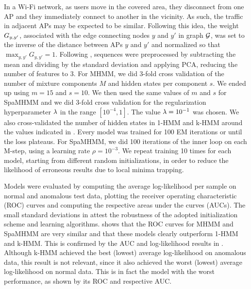 In a Wi-Fi network, as users move in the covered area, they disconnect from one AP and they immediately connect to another in the vicinity. As such, the traffic in adjacent APs may be expected to be similar. Following this idea, the weight ${G}_{y,y'}$, associated with the edge connecting nodes $y$ and $y'$ in graph ${\mathcal{G}}$, was set to the inverse of the distance between APs $y$ and $y'$ and normalized so that $\max_{y,y'} G_{y,y'}=1$. Following \citet{Anisa2017}, sequences were preprocessed by subtracting the mean and dividing by the standard deviation and applying PCA, reducing the number of features to 3. For MHMM, we did 3-fold cross validation of the number of mixture components $M$ and hidden states per component $s$. We ended up using $m=15$ and $s=10$. We then used the same values of $m$ and $s$ for SpaMHMM and we did 3-fold cross validation for the regularization hyperparameter $\lambda$ in the range $[10^{-4}, 1]$. The value $\lambda=10^{-1}$ was chosen. We also cross-validated the number of hidden states in 1-HMM and k-HMM around the values indicated in . Every model was trained for 100 EM iterations or until the loss plateaus. For SpaMHMM, we did 100 iterations of the inner loop on each M-step, using a learning rate $\rho=10^{-3}$. We repeat training 10 times for each model, starting from different random initializations, in order to reduce the likelihood of erroneous results due to local minima trapping.

Models were evaluated by computing the average log-likelihood per sample on normal and anomalous test data, plotting the receiver operating characteristic (ROC) curves and computing the respective areas under the curves (AUCs). The small standard deviations in  attest the robustness of the adopted initialization scheme and learning algorithms.  shows that the ROC curves for MHMM and SpaMHMM are very similar and that these models clearly outperform 1-HMM and k-HMM. This is confirmed by the AUC and log-likelihood results in . Although k-HMM achieved the best (lowest) average log-likelihood on anomalous data, this result is not relevant, since it also achieved the worst (lowest) average log-likelihood on normal data. This is in fact the model with the worst performance, as shown by its ROC and respective AUC.

